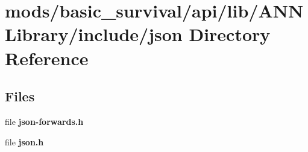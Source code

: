 \section{mods/basic\+\_\+survival/api/lib/\+A\+N\+N\+Library/include/json Directory Reference}
\label{dir_2b8753fa19b9b2cfc1f8d4a491deaa9c}
\subsection*{Files}
\begin{DoxyCompactItemize}
\item 
file {\bfseries json-\/forwards.\+h}
\item 
file {\bfseries json.\+h}
\end{DoxyCompactItemize}
